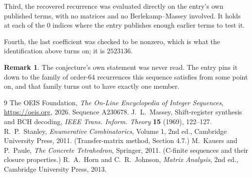 \documentclass[11pt,a4paper]{article}
\theoremstyle{plain}
\theoremstyle{definition}
\newtheorem{remark}[theorem]{Remark}
\begin{document}
Third, the recovered recurrence was evaluated directly on the entry's own published terms, with
no matrices and no Berlekamp--Massey involved. It holds at each of the $0$ indices where
the entry publishes enough earlier terms to test it.

Fourth, the last coefficient was checked to be nonzero, which is what the identification above
turns on; it is $2523136$.

\begin{remark}
The conjecture's own statement was never read. The entry pins it down to the family of
order-$64$ recurrences this sequence satisfies from some point on, and that family turns
out to have exactly one member.
\end{remark}

\begin{thebibliography}{9}
 The OEIS Foundation, \emph{The On-Line Encyclopedia of Integer
Sequences}, \url{https://oeis.org}, 2026. Sequence A230678.
 J.~L.~Massey, Shift-register synthesis and BCH decoding, \emph{IEEE
Trans. Inform. Theory} \textbf{15} (1969), 122--127.
 R.~P.~Stanley, \emph{Enumerative Combinatorics}, Volume 1, 2nd ed.,
Cambridge University Press, 2011. (Transfer-matrix method, Section 4.7.)
 M.~Kauers and P.~Paule, \emph{The Concrete Tetrahedron}, Springer, 2011.
(C-finite sequences and their closure properties.)
 R.~A.~Horn and C.~R.~Johnson, \emph{Matrix Analysis}, 2nd ed., Cambridge
University Press, 2013.
\end{thebibliography}
\end{document}
